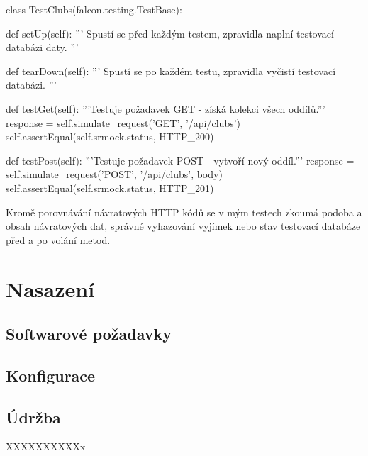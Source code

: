 \documentclass[thesis=B,czech]{FITthesis}[2012/06/26]
\begin{document}
\begin{python}
class TestClubs(falcon.testing.TestBase):

    def setUp(self):
      '''
      Spustí se před každým testem,
      zpravidla naplní testovací databázi daty.
      '''

    def tearDown(self):
      '''
      Spustí se po každém testu,
      zpravidla vyčistí testovací databázi.
      '''

    def testGet(self):
      '''Testuje požadavek GET - získá kolekci všech oddílů.'''     
      response = self.simulate_request('GET', '/api/clubs')
      self.assertEqual(self.srmock.status, HTTP_200)

    def testPost(self):
      '''Testuje požadavek POST - vytvoří nový oddíl.'''
      response = self.simulate_request('POST', '/api/clubs', body)
      self.assertEqual(self.srmock.status, HTTP_201)
\end{python}

Kromě porovnávání návratových HTTP kódů se v mým testech zkoumá podoba a obsah návratových dat, správné vyhazování vyjímek
nebo stav testovací databáze před a po volání metod.


\chapter{Nasazení}


\section{Softwarové požadavky}

\section{Konfigurace}

\section{Údržba}

XXXXXXXXXXx \cite{JJ92}

\end{document}
